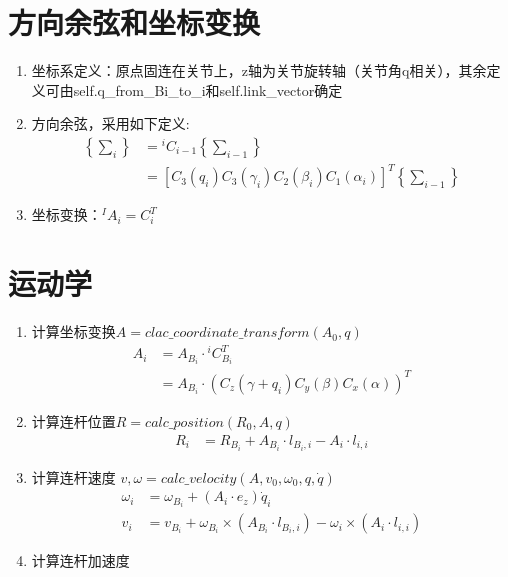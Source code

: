 \documentclass[UTF8]{ctexart}
\begin{document}
\section{方向余弦和坐标变换}
\begin{enumerate}[itemindent=0.3em]
	\item 坐标系定义：原点固连在关节上，z轴为关节旋转轴（关节角q相关），其余定义可由self.q\_from\_Bi\_to\_i和self.link\_vector确定
	\item 方向余弦，采用如下定义:
	\begin{align*}
		\left\{\sum\nolimits_{i}\right\}&={}^{i}\!C_{i-1}\left\{\sum\nolimits_{i-1}\right\}\\
		&=\left[C_{3}(q_{i})C_{3}(\gamma_{i})C_{2}(\beta_{i})C_{1}(\alpha_{i})\right]^{T}\left\{\sum\nolimits_{i-1}\right\}
	\end{align*}
	\item 坐标变换：$ {}^{I}\!A_{i}=C_{i}^{T}$
\end{enumerate}

\section{运动学}
\begin{enumerate}[itemindent=0.3em]
	\item 计算坐标变换$ A = clac\_coordinate\_transform(A_{0},q) $ 
	\begin{align*}
	A_{i} &= A_{B_{i}}\cdot{}^{i}C_{B_{i}}^{T}\\
	& = A_{B_{i}}\cdot (C_{z}(\gamma+q_{i})C_{y}(\beta)C_{x}(\alpha))^{T}
	\end{align*}
	\item 计算连杆位置$R=calc\_position(R_{0},A,q)$ 
	\begin{align*}
		R_{i} &= R_{B_{i}} + A_{B_{i}}\cdot l_{B_{i},i} - A_{i}\cdot l_{i,i}
	\end{align*}
	\item 计算连杆速度 $ v, \omega = calc\_velocity(A,v_{0},\omega_{0},q,\dot{q})$
	\begin{align*}
		\omega_{i} &= \omega_{B_{i}} + (A_{i}\cdot e_{z} )\dot{q}_{i}\\
		v_{i} &= v_{B_{i}} + \omega_{B_{i}} \times (A_{B_{i}}\cdot l_{B_{i},i}) - \omega_{i}\times (A_{i}\cdot l_{i,i})
	\end{align*}
	\item 计算连杆加速度
\end{enumerate} 
\end{document}
